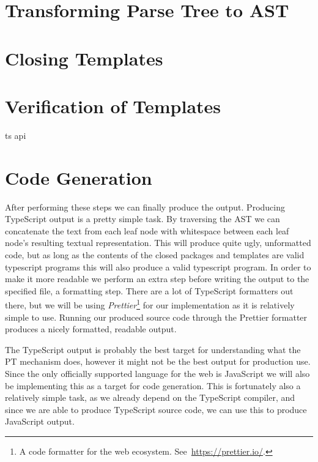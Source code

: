\section{Transforming Parse Tree to AST}\label{sec:transforming-parse-tree-to-ast}


\section{Closing Templates}\label{sec:closing-templates}


\section{Verification of Templates}\label{sec:verification-of-templates}

ts api

\section{Code Generation}\label{sec:code-generation}

After performing these steps we can finally produce the output.
Producing TypeScript output is a pretty simple task.
By traversing the AST we can concatenate the text from each leaf node with whitespace between each leaf node's resulting textual representation.
This will produce quite ugly, unformatted code, but as long as the contents of the closed packages and templates are valid typescript programs this will also produce a valid typescript program.
In order to make it more readable we perform an extra step before writing the output to the specified file, a formatting step.
There are a lot of TypeScript formatters out there, but we will be using \textit{Prettier}\footnote{A code formatter for the web ecosystem. See~\url{https://prettier.io/}.} for our implementation as it is relatively simple to use.
Running our produced source code through the Prettier formatter produces a nicely formatted, readable output.

The TypeScript output is probably the best target for understanding what the PT mechanism does, however it might not be the best output for production use.
Since the only officially supported language for the web is JavaScript we will also be implementing this as a target for code generation.
This is fortunately also a relatively simple task, as we already depend on the TypeScript compiler, and since we are able to produce TypeScript source code, we can use this to produce JavaScript output.

